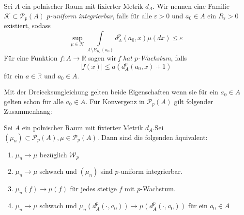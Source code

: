 \begin{definition}
    Sei $A$ ein polnischer Raum mit fixierter Metrik $d_A$. Wir nennen eine Familie $\mathcal{K} \subset \mathcal{P}_p(A)$ \emph{$p$-uniform integrierbar}, falls für alle $\varepsilon>0$ und $a_0 \in A$ ein $R_\varepsilon>0$ existiert, sodass
    $$\sup\limits_{\mu \in \mathcal{K}} \int\limits_{A\setminus B_{R_\varepsilon}(a_0)} d_A^p(a_0, x)\mu(dx) \leq \varepsilon $$
    Für eine Funktion $f: A \rightarrow \mathbb{R}$ sagen wir \emph{f hat $p$-Wachstum}, falls 
    $$|f(x)|\leq a(d_A^p(a_0, x) + 1)$$
    für ein $a\in \mathbb{R}$ und $a_0 \in A$.
\end{definition}
Mit der Dreiecksungleichung gelten beide Eigenschaften wenn sie für ein $a_0 \in A$ gelten schon für alle $a_0 \in A$.
Für Konvergenz in $\mathcal{P}_p(A)$ gilt folgender Zusammenhang:
\begin{lemma}\label{thm:conv_char}
Sei $A$ ein polnischer Raum mit fixierter Metrik $d_A$.Sei $(\mu_n) \subset \mathcal{P}_p(A), \mu \in \mathcal{P}_p(A)$. Dann sind die folgenden äquivalent:
\begin{enumerate}
    \item $\mu_n \rightarrow \mu$ bezüglich $\mathcal{W}_p$
    \item $\mu_n \rightarrow \mu$ schwach und $(\mu_n)$ sind $p$-uniform integrierbar.
    \item $\mu_n(f) \rightarrow \mu(f)$ für jedes stetige $f$ mit $p$-Wachstum.
    \item $\mu_n \rightarrow \mu$ schwach und $\mu_n(d_A^p(\cdot, a_0)) \rightarrow \mu(d_A^p(\cdot, a_0))$ für ein $a_0 \in A$
\end{enumerate}
\end{lemma}
